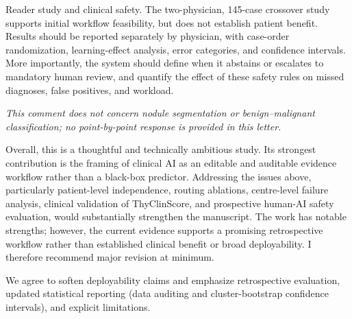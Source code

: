 \begin{reviewercomment}
Reader study and clinical safety. The two-physician, 145-case crossover study supports initial workflow feasibility, but does not establish patient benefit. Results should be reported separately by physician, with case-order randomization, learning-effect analysis, error categories, and confidence intervals. More importantly, the system should define when it abstains or escalates to mandatory human review, and quantify the effect of these safety rules on missed diagnoses, false positives, and workload.
\end{reviewercomment}
\begin{authorresponse}
\noindent\textit{This comment does not concern nodule segmentation or benign--malignant classification; no point-by-point response is provided in this letter.}
\end{authorresponse}

\begin{reviewercomment}
Overall, this is a thoughtful and technically ambitious study. Its strongest contribution is the framing of clinical AI as an editable and auditable evidence workflow rather than a black-box predictor. Addressing the issues above, particularly patient-level independence, routing ablations, centre-level failure analysis, clinical validation of ThyClinScore, and prospective human-AI safety evaluation, would substantially strengthen the manuscript. The work has notable strengths; however, the current evidence supports a promising retrospective workflow rather than established clinical benefit or broad deployability. I therefore recommend major revision at minimum.
\end{reviewercomment}
\begin{authorresponse}
We agree to soften deployability claims and emphasize retrospective evaluation, updated statistical reporting (data auditing and cluster-bootstrap confidence intervals), and explicit limitations.\par
\end{authorresponse}

